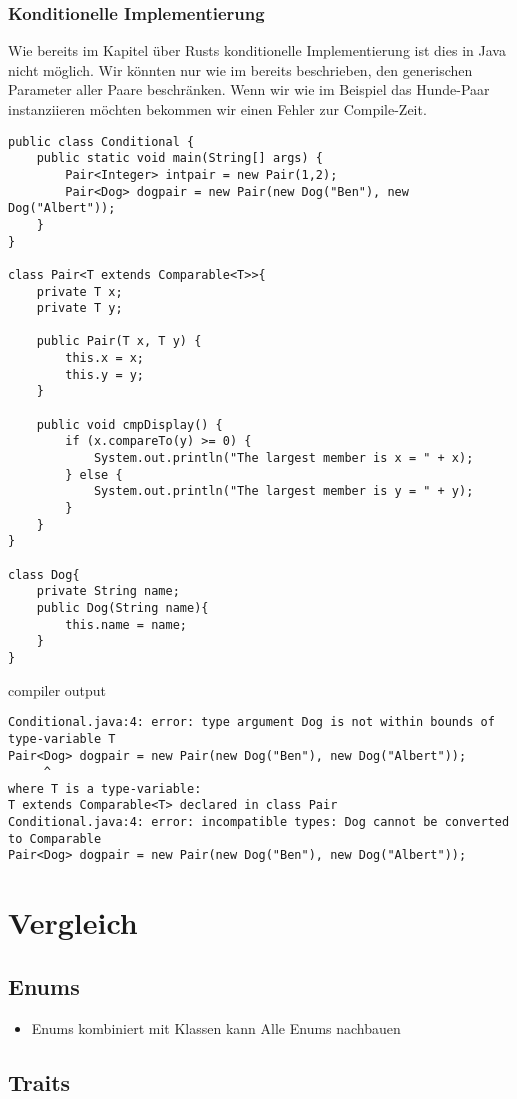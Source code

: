 \documentclass[a4paper, 1ppt]{article}
\begin{document}
\subsubsection{Konditionelle Implementierung}
Wie bereits im Kapitel über Rusts konditionelle Implementierung ist dies in Java nicht möglich.
Wir könnten nur wie im bereits beschrieben, den generischen Parameter aller Paare beschränken.
Wenn wir wie im Beispiel das Hunde-Paar instanziieren möchten bekommen wir einen Fehler zur Compile-Zeit.
\begin{verbatim}
public class Conditional {
    public static void main(String[] args) {
        Pair<Integer> intpair = new Pair(1,2);
        Pair<Dog> dogpair = new Pair(new Dog("Ben"), new Dog("Albert"));
    }    
}

class Pair<T extends Comparable<T>>{
    private T x;
    private T y;

    public Pair(T x, T y) {
        this.x = x;
        this.y = y;
    }

    public void cmpDisplay() {
        if (x.compareTo(y) >= 0) {
            System.out.println("The largest member is x = " + x);
        } else {
            System.out.println("The largest member is y = " + y);
        }
    }
}

class Dog{
    private String name;
    public Dog(String name){
        this.name = name;
    }
}
\end{verbatim}
compiler output
\begin{verbatim}
Conditional.java:4: error: type argument Dog is not within bounds of type-variable T
Pair<Dog> dogpair = new Pair(new Dog("Ben"), new Dog("Albert"));
	 ^
where T is a type-variable:
T extends Comparable<T> declared in class Pair
Conditional.java:4: error: incompatible types: Dog cannot be converted to Comparable
Pair<Dog> dogpair = new Pair(new Dog("Ben"), new Dog("Albert"));
\end{verbatim}
\newpage
\section{Vergleich}
\subsection{Enums}
\begin{itemize}
	\item Enums kombiniert mit Klassen kann Alle Enums nachbauen
\end{itemize}
\subsection{Traits}



\end{document}
